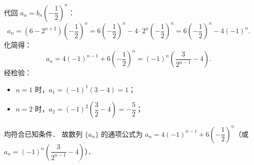 \begin{answer}
代回 $a_n = b_n \left(-\dfrac{1}{2}\right)^n$：
\nopagebreak[4]
\[
a_n = \left(6 - 2^{n+2}\right)\left(-\dfrac{1}{2}\right)^n = 6\left(-\dfrac{1}{2}\right)^n - 4 \cdot 2^n \left(-\dfrac{1}{2}\right)^n = 6\left(-\dfrac{1}{2}\right)^n - 4(-1)^n.
\]
化简得：
\nopagebreak[4]
\[
a_n = 4(-1)^{n-1} + 6\left(-\dfrac{1}{2}\right)^n = (-1)^n \left(\dfrac{3}{2^{n-1}} - 4\right).
\]
经检验：
\begin{itemize}
\item $n = 1$ 时，$a_1 = (-1)^1 (3 - 4) = 1$；
\item $n = 2$ 时，$a_2 = (-1)^2 \left(\dfrac{3}{2} - 4\right) = -\dfrac{5}{2}$；
\end{itemize}
均符合已知条件．
故数列 $\{a_n\}$ 的通项公式为 $a_n = 4(-1)^{n-1} + 6\left(-\dfrac{1}{2}\right)^n$（或 $a_n = (-1)^n \left(\dfrac{3}{2^{n-1}} - 4\right)$）．


\end{answer}